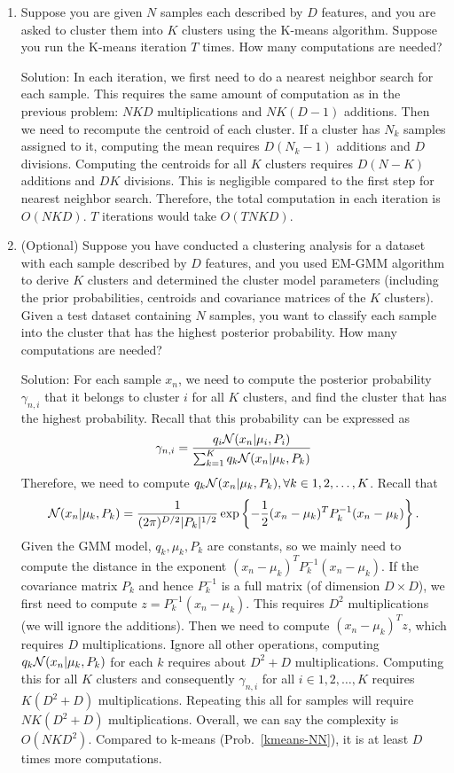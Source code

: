 \documentclass[11pt]{article}
\begin{document}
\begin{enumerate}
\item\label{kmeans}
Suppose you are given $N$ samples each described by $D$ features, and you are asked to cluster them into $K$ clusters using the K-means algorithm. Suppose you run the K-means iteration $T$ times. How many computations are needed? 

Solution: In each iteration, we first need to  do a nearest neighbor search for each sample. This requires the same amount of computation as in the previous problem: $NKD$ multiplications and $NK(D-1)$ additions. Then we need to recompute the centroid of each cluster. If a cluster has $N_k$ samples assigned to it, computing the mean requires $D(N_k-1)$ additions and $D$ divisions. Computing the centroids for all $K$ clusters requires $D(N-K)$ additions and $DK$ divisions. This is negligible compared to the first step for nearest neighbor search.  Therefore, the total computation in each iteration is $O(NKD)$.  $T$ iterations would take $O(TNKD).$

  
 \item (Optional)
  Suppose you have conducted a clustering analysis for a dataset with each sample described by $D$ features, and you used EM-GMM algorithm to derive $K$ clusters and determined the cluster model parameters (including the prior probabilities, centroids and covariance matrices of the $K$ clusters). Given a test dataset containing $N$ samples,  you want to classify each sample into the cluster  that has the highest posterior probability. How many computations are needed? 
 
 
 Solution: For each sample  $x_n$, we need to compute the posterior probability $\gamma_{n,i}$ that it belongs to cluster $i$ for all $K$ clusters, and find the cluster that has the highest probability.   Recall that this probability can be expressed as 
 $$\gamma_{n,i} = \frac{q_i {\cal N}(x_n|\mu_i,P_i) }{\sum_{k=1}^K q_k {\cal N}(x_n|\mu_k,P_k)} $$
 Therefore, we need to compute $q_k {\cal N}(x_n|\mu_k,P_k), \forall k\in {1,2,\ldots,K}$.
 Recall that 
 $${\cal N}(x_n|\mu_k,P_k) = \frac{1}{(2\pi)^{D/2} | P_k|^{1/2}} \exp \left \{ -\frac{1}{2} (x_n-\mu_k)^T P_k^{-1} (x_n-\mu_k) \right \}.$$
 Given the GMM model, $q_k, \mu_k, P_k$ are constants, so we mainly need to compute the distance in the exponent $(x_n-\mu_k)^T P_k^{-1} (x_n-\mu_k)$. If the covariance matrix $P_k$ and hence $P_k^{-1}$ is a full matrix (of dimension $D\times D$), we first need to compute $z=P_k^{-1} (x_n-\mu_k)$. This requires $D^2$ multiplications (we will ignore the additions). Then we need to compute  $(x_n-\mu_k)^T z$, which requires $D$ multiplications. Ignore all other operations, computing $q_k {\cal N}(x_n|\mu_k,P_k) $ for each $k$ requires about $D^2+D$ multiplications. Computing this for all $K$ clusters and consequently $\gamma_{n,i}$ for all $i \in {1,2,\ldots, K}$ requires $K(D^2+D)$ multiplications. Repeating this all for samples will require $N K (D^2+D)$ multiplications. Overall, we can say the complexity is  $O(NKD^2).$ Compared to k-means (Prob.~\ref{kmeans-NN}), it is at least $D$ times more computations.
 

\end{enumerate}
\end{document}
